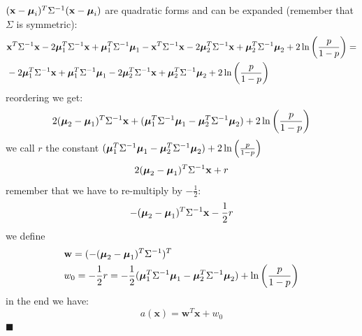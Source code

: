 \documentclass[10pt, letterpaper]{report}
\begin{document}
$(\mathbf x-{\boldsymbol{\mu}}_i)^T\Sigma^{-1}(\mathbf x-{\boldsymbol{\mu}}_i)$ are quadratic forms and can be expanded (remember that $\Sigma$ is symmetric):
\begin{align}
    &\mathbf x^T\Sigma^{-1}\mathbf x-2{\boldsymbol{\mu}}_1^T\Sigma^{-1}\mathbf x+{\boldsymbol{\mu}}_1^T\Sigma^{-1}{\boldsymbol{\mu}}_1
    -
    \mathbf x^T\Sigma^{-1}\mathbf x-2{\boldsymbol{\mu}}_2^T\Sigma^{-1}\mathbf x+{\boldsymbol{\mu}}_2^T\Sigma^{-1}{\boldsymbol{\mu}}_2
    +
    2\ln\left(\frac{p}{1-p}\right)=\\
    &-2{\boldsymbol{\mu}}_1^T\Sigma^{-1}\mathbf x+{\boldsymbol{\mu}}_1^T\Sigma^{-1}{\boldsymbol{\mu}}_1
    -2{\boldsymbol{\mu}}_2^T\Sigma^{-1}\mathbf x+{\boldsymbol{\mu}}_2^T\Sigma^{-1}{\boldsymbol{\mu}}_2
    +
    2\ln\left(\frac{p}{1-p}\right)
\end{align}
reordering we get:\begin{equation}
    2({\boldsymbol{\mu}}_2-{\boldsymbol{\mu}}_1)^T\Sigma^{-1}\mathbf x+({\boldsymbol{\mu}}_1^T\Sigma^{-1}{\boldsymbol{\mu}}_1-{\boldsymbol{\mu}}_2^T\Sigma^{-1}{\boldsymbol{\mu}}_2)+
    2\ln\left(\frac{p}{1-p}\right)
\end{equation}
we call $r$ the constant $({\boldsymbol{\mu}}_1^T\Sigma^{-1}{\boldsymbol{\mu}}_1-{\boldsymbol{\mu}}_2^T\Sigma^{-1}{\boldsymbol{\mu}}_2)+
    2\ln\left(\frac{p}{1-p}\right)$
    \begin{equation}
    2({\boldsymbol{\mu}}_2-{\boldsymbol{\mu}}_1)^T\Sigma^{-1}\mathbf x+r
\end{equation}
remember that we have to re-multiply by $-\frac{1}{2}$:
\begin{equation}
    -({\boldsymbol{\mu}}_2-{\boldsymbol{\mu}}_1)^T\Sigma^{-1}\mathbf x-\frac{1}{2}r
\end{equation}
we define\begin{align}
    &\mathbf w=(-({\boldsymbol{\mu}}_2-{\boldsymbol{\mu}}_1)^T\Sigma^{-1})^T\\ 
    &w_0=-\frac{1}{2}r=-\frac{1}{2} ({\boldsymbol{\mu}}_1^T\Sigma^{-1}{\boldsymbol{\mu}}_1-{\boldsymbol{\mu}}_2^T\Sigma^{-1}{\boldsymbol{\mu}}_2)+
    \ln\left(\frac{p}{1-p}\right)
\end{align}
in the end we have:\begin{equation}
    a(\mathbf x)=\mathbf w^T\mathbf x+w_0
\end{equation}
\hfill$\blacksquare$
\end{document}
